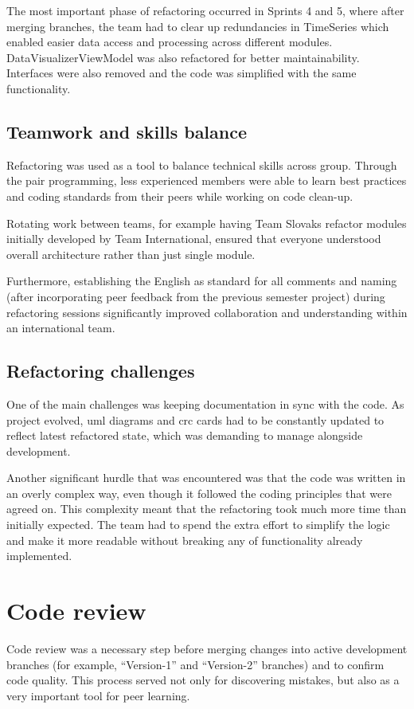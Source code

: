 The most important phase of refactoring occurred in Sprints 4 and 5, where after merging branches, the team had to clear up redundancies in TimeSeries which enabled easier data access and processing across different modules. DataVisualizerViewModel was also refactored for better maintainability. Interfaces were also removed and the code was simplified with the same functionality.

\subsection{Teamwork and skills balance}
Refactoring was used as a tool to balance technical skills across group. Through the pair programming, less experienced members were able to learn best practices and coding standards from their peers while working on code clean-up.

Rotating work between teams, for example having Team Slovaks refactor modules initially developed by Team International, ensured that everyone understood overall architecture rather than just single module.

Furthermore, establishing the English as standard for all comments and naming (after incorporating peer feedback from the previous semester project) during refactoring sessions significantly improved collaboration and understanding within an international team.

\subsection{Refactoring challenges}
One of the main challenges was keeping documentation in sync with the code. As project evolved, \acrshort{uml} diagrams and \acrshort{crc} cards had to be constantly updated to reflect latest refactored state, which was demanding to manage alongside development.

Another significant hurdle that was encountered was that the code was written in an overly complex way, even though it followed the coding principles that were agreed on. This complexity meant that the refactoring took much more time than initially expected. The team had to spend the extra effort to simplify the logic and make it more readable without breaking any of functionality already implemented.

\section{Code review}
Code review was a necessary step before merging changes into active development branches (for example, ``Version-1'' and ``Version-2'' branches) and to confirm code quality. This process served not only for discovering mistakes, but also as a very important tool for peer learning.

